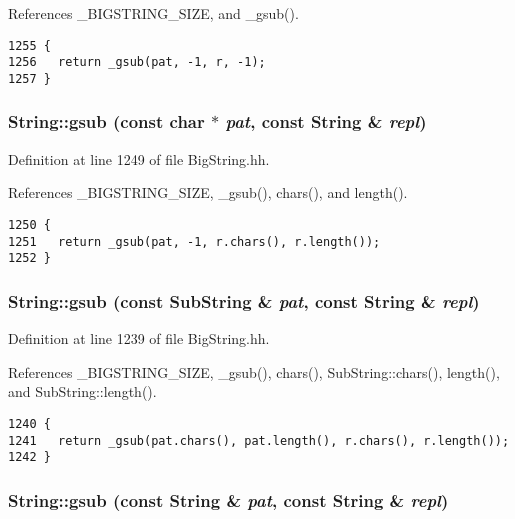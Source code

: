 References \_\-BIGSTRING\_\-SIZE, and \_\-gsub().



\footnotesize\begin{verbatim}1255 {
1256   return _gsub(pat, -1, r, -1);
1257 }
\end{verbatim}\normalsize 
{}
\subsubsection{ String::gsub (const char $\ast$ {\em pat}, const String \& {\em repl})\hspace{0.3cm}{\tt  [inline]}}\label{classString_a91}




Definition at line 1249 of file Big\-String.hh.

References \_\-BIGSTRING\_\-SIZE, \_\-gsub(), chars(), and length().



\footnotesize\begin{verbatim}1250 {
1251   return _gsub(pat, -1, r.chars(), r.length());
1252 }
\end{verbatim}\normalsize 
{}
\subsubsection{ String::gsub (const {\bf Sub\-String} \& {\em pat}, const String \& {\em repl})\hspace{0.3cm}{\tt  [inline]}}\label{classString_a90}




Definition at line 1239 of file Big\-String.hh.

References \_\-BIGSTRING\_\-SIZE, \_\-gsub(), chars(), Sub\-String::chars(), length(), and Sub\-String::length().



\footnotesize\begin{verbatim}1240 {
1241   return _gsub(pat.chars(), pat.length(), r.chars(), r.length());
1242 }
\end{verbatim}\normalsize 
{}
\subsubsection{ String::gsub (const String \& {\em pat}, const String \& {\em repl})\hspace{0.3cm}{\tt  [inline]}}\label{classString_a89}




